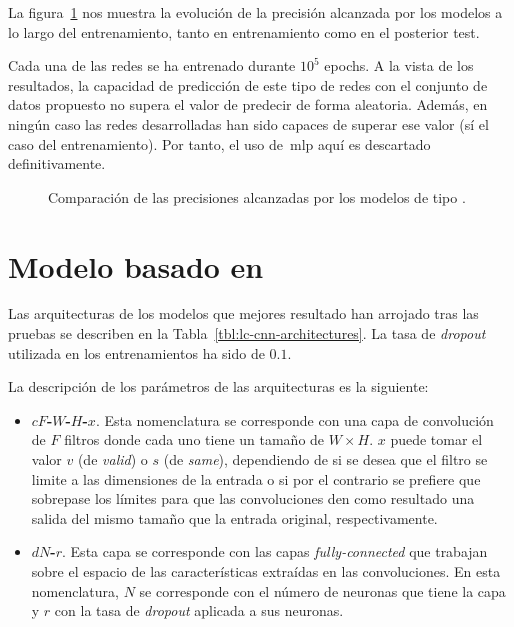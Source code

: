 La figura~\ref{fig:lc-mlp-accuracy-comparison} nos muestra la evolución de la precisión alcanzada por los modelos a lo largo del entrenamiento, tanto en entrenamiento como en el posterior test.

Cada una de las redes se ha entrenado durante $10^5$ epochs. A la vista de los resultados, la capacidad de predicción de este tipo de redes con el conjunto de datos propuesto no supera el valor de predecir de forma aleatoria. Además, en  ningún caso las redes desarrolladas han sido capaces de superar ese valor (sí el caso del entrenamiento). Por tanto, el uso de~\ac{mlp} aquí es descartado definitivamente.

\begin{figure}
	\centering
	\qquad
	\caption[Comparación de las precisiones alcanzadas por los modelos de tipo \acrshort{mlp}]{Comparación de las precisiones alcanzadas por los modelos de tipo .}
	\label{fig:lc-mlp-accuracy-comparison}
\end{figure}

\section{Modelo basado en }

Las arquitecturas de los modelos que mejores resultado han arrojado tras las pruebas se describen en la Tabla~\ref{tbl:lc-cnn-architectures}. La tasa de \textit{dropout} utilizada en los entrenamientos ha sido de $0.1$.

La descripción de los parámetros de las arquitecturas es la siguiente:

\begin{itemize}
	\item \textbf{$cF$-$W$-$H$-$x$}. Esta nomenclatura se corresponde con una capa de convolución de $F$ filtros donde cada uno tiene un tamaño de $W \times H$. $x$ puede tomar el valor $v$ (de \textit{valid}) o $s$ (de \textit{same}), dependiendo de si se desea que el filtro se limite a las dimensiones de la entrada o si por el contrario se prefiere que sobrepase los límites para que las convoluciones den como resultado una salida del mismo tamaño que la entrada original, respectivamente.
	\item \textbf{$dN$-$r$}. Esta capa se corresponde con las capas \textit{fully-connected} que trabajan sobre el espacio de las características extraídas en las convoluciones. En esta nomenclatura, $N$ se corresponde con el número de neuronas que tiene la capa y $r$ con la tasa de \textit{dropout} aplicada a sus neuronas.
\end{itemize}


